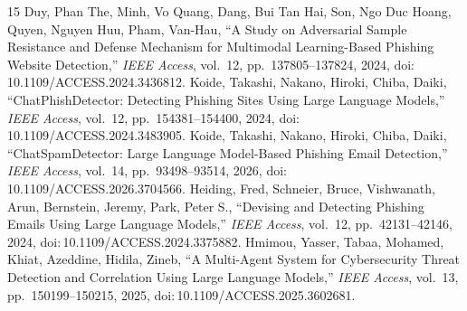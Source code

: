 \begin{thebibliography}{15}
 Duy, Phan The, Minh, Vo Quang, Dang, Bui Tan Hai, Son, Ngo Duc Hoang, Quyen, Nguyen Huu, Pham, Van-Hau, ``A Study on Adversarial Sample Resistance and Defense Mechanism for Multimodal Learning-Based Phishing Website Detection,'' \emph{IEEE Access}, vol.\ 12, pp.\ 137805--137824, 2024, doi:\,10.1109/ACCESS.2024.3436812.
 Koide, Takashi, Nakano, Hiroki, Chiba, Daiki, ``ChatPhishDetector: Detecting Phishing Sites Using Large Language Models,'' \emph{IEEE Access}, vol.\ 12, pp.\ 154381--154400, 2024, doi:\,10.1109/ACCESS.2024.3483905.
 Koide, Takashi, Nakano, Hiroki, Chiba, Daiki, ``ChatSpamDetector: Large Language Model-Based Phishing Email Detection,'' \emph{IEEE Access}, vol.\ 14, pp.\ 93498--93514, 2026, doi:\,10.1109/ACCESS.2026.3704566.
 Heiding, Fred, Schneier, Bruce, Vishwanath, Arun, Bernstein, Jeremy, Park, Peter S., ``Devising and Detecting Phishing Emails Using Large Language Models,'' \emph{IEEE Access}, vol.\ 12, pp.\ 42131--42146, 2024, doi:\,10.1109/ACCESS.2024.3375882.
 Hmimou, Yasser, Tabaa, Mohamed, Khiat, Azeddine, Hidila, Zineb, ``A Multi-Agent System for Cybersecurity Threat Detection and Correlation Using Large Language Models,'' \emph{IEEE Access}, vol.\ 13, pp.\ 150199--150215, 2025, doi:\,10.1109/ACCESS.2025.3602681.
\end{thebibliography}
